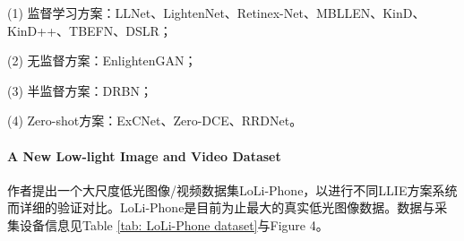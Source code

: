 \documentclass[letterpaper,12pt]{article}
\begin{document}
	(1) 监督学习方案：LLNet、LightenNet、Retinex-Net、MBLLEN、KinD、KinD++、TBEFN、DSLR；
	
	(2) 无监督方案：EnlightenGAN；
	
	(3)	半监督方案：DRBN；
	
	(4)	Zero-shot方案：ExCNet、Zero-DCE、RRDNet。
	
	
	\paragraph{A New Low-light Image and Video Dataset} \qquad
	
	作者提出一个大尺度低光图像/视频数据集LoLi-Phone，以进行不同LLIE方案系统而详细的验证对比。LoLi-Phone是目前为止最大的真实低光图像数据。数据与采集设备信息见Table \ref{tab: LoLi-Phone dataset}与Figure 4。
	
\end{document}
